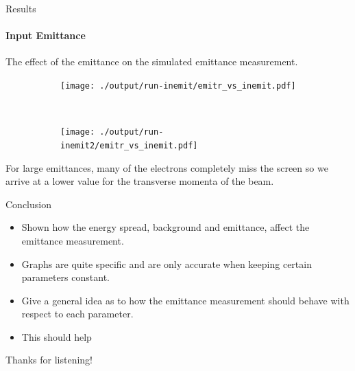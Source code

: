 \documentclass[aspectratio=169]{beamer}
\begin{document}
\begin{frame}{Results}
	\framesubtitle{Input Emittance}
	The effect of the emittance on the simulated emittance measurement.\\
	\begin{figure}
		\centering
		\begin{subfigure}[b]{0.45\textwidth}
			\centering
			\texttt{[image: ./output/run-inemit/emitr\_vs\_inemit.pdf]}
		\end{subfigure}%
		~
		\begin{subfigure}[b]{0.55\textwidth}
			\centering
			\texttt{[image: ./output/run-inemit2/emitr\_vs\_inemit.pdf]}
		\end{subfigure}
	\end{figure}

	For large emittances, many of the electrons completely miss the screen so
	we arrive at a lower value for the transverse momenta of the beam.
\end{frame}

\begin{frame}{Conclusion}
	\begin{itemize}
		\item Shown how the energy spread, background and emittance, affect the
			emittance measurement.
		\item Graphs are quite specific and are only accurate when
			keeping certain parameters constant.
		\item Give a general idea as to how the emittance measurement should
			behave with respect to each parameter.
		\item This should help 
	\end{itemize}
	\vfill
	\centering
	Thanks for listening!
\end{frame}
\end{document}
